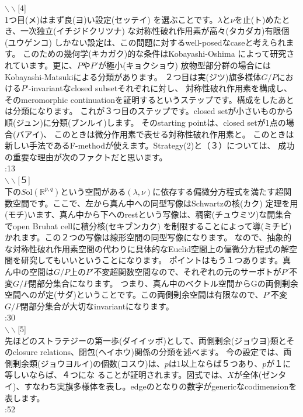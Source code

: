 \documentclass[11pt]{article} %
\newcommand{\slide}[1]{\noindent$\backslash\backslash$[#1]\\}
\newcommand{\mytime}[1]{\noindent #1\\}
\newcommand{\kana}[2]{#1{\scriptsize (#2)}}
\newcommand{\doubt}[1]{\fbox{#1}}
\begin{document}
\slide{4}
1つ\kana{目}{メ}はまず\kana{良}{ヨ}い\kana{設定}{セッテイ}
を選ぶことです。$\lambda$と$\nu$を\kana{止}{ト}めたとき、\kana{一次独立}{イチジドクリツナ}
な対称性破れ作用素が\kana{高々}{タカダカ}\kana{有限個}{ユウゲンコ}
しかない設定は、この問題に対するwell-posedなcaseと考えられます。
このための\kana{幾何学}{キカガク}的な条件はKobayashi-Oshima
によって研究されています。更に、$P$や$P'$が\kana{極小}{キョクショウ}
放物型部分群の場合にはKobayashi-Matsukiによる分類があります。
２つ目は\kana{実}{ジツ}旗多様体$G/P$における$P’$-invariantなclosed subsetそれぞれに対し、
対称性破れ作用素を構成し、そのmeromorphic continuationを証明するというステップです。構成をしたあとは分類になります。
これが３つ目のステップです。closed setが小さいものから\kana{順}{ジュン}に\kana{分類}{ブンルイ}します。
そのstarting pointは、closed setが1点の\kana{場合}{バアイ}\doubt{で}、
このときは微分作用素で表せる対称性破れ作用素と\doubt{なります}。
このときは新しい手法であるF-methodが使えます。Strategy(2)と（３）については、
成功の重要な理由が次のファクトだと思います。\\
\mytime{1:13}

\slide{５}
下の$S\mbox{ol}\left(
\mathbb{R}^{p,q}
\right)$という空間がある$(\lambda,\nu)$に依存する偏微分方程式を満たす超関数空間です。ここで、左から真ん中への同型写像はSchwartzの\kana{核}{カク}
定理を\kana{用}{モチ}います、真ん中から下へのrestという写像は、\kana{稠密}{チュウミツ}な開集合で\doubt{ある}open Bruhat cellに\kana{積分核}{セキブンカク}
を制限することによって\kana{導}{ミチビ}かれます。この２つの写像は線形空間の同型写像になります。
なので、抽象的な対称性破れ作用素空間の代わりに具体的なEuclid空間上の偏微分方程式の解空間を研究してもいいということになります。
ポイントはもう１つあります。真ん中の空間は$G/P$上の$P'$不変超関数空間なので、それぞれの元のサーポトが$P'$不変$G/P$閉部分集合になります。
つまり、真ん中のベクトル空間からGの両側剰余空間へのが\kana{定}{サダ}\doubt{まった}ということです。この両側剰余空間は有限なので、$P'$不変$G/P$閉部分集合が大切なinvariantになります。\\
\mytime{1:30}

\slide{5}
先ほどのストラテジーの\kana{第一歩}{ダイイッポ}として、両側\kana{剰余}{ジョウヨ}類とそのclosure relations、\kana{閉包}{ヘイホウ}関係の分類を述べます。
今の設定では、両側\kana{剰余類}{ジョウヨルイ}の\kana{個数}{コスウ}は、$p$は1以上ならば５つあり、$p$が１に等しいならば、４つにな
ることが証明されます。図式では、$X$が\kana{全体}{ゼンタイ}、すなわち実旗多様体を表し。edgeのとなりの数字がgenericなcodimensionを表します。\\
\mytime{0:52}
\end{document}
